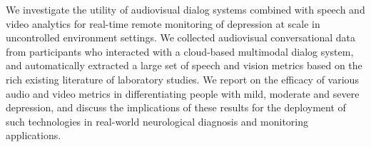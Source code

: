 We investigate the utility of audiovisual dialog systems combined with speech and video analytics for real-time remote monitoring of depression at scale in uncontrolled environment settings. We collected audiovisual conversational data from participants who interacted with a cloud-based multimodal dialog system, and automatically extracted a large set of speech and vision metrics based on the rich existing literature of laboratory studies. We report on the efficacy of various audio and video metrics in differentiating people with mild, moderate and severe depression, and discuss the implications of these results for the deployment of such technologies in real-world neurological diagnosis and monitoring applications.
